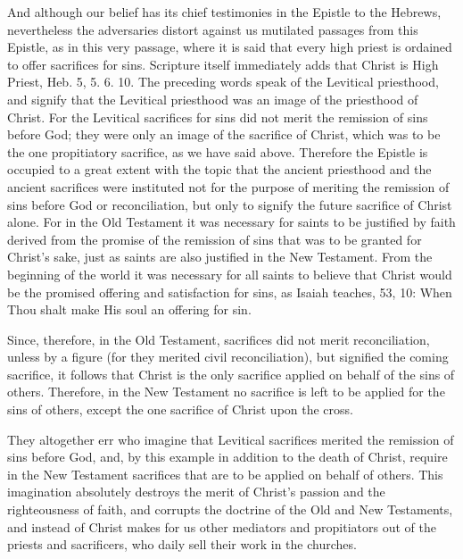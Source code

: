 And although our belief has its chief testimonies in the Epistle to
the Hebrews, nevertheless the adversaries distort against us
mutilated passages from this Epistle, as in this very passage, where
it is said that every high priest is ordained to offer sacrifices for
sins.  Scripture itself immediately adds that Christ is High Priest,
Heb. 5, 5. 6. 10. The preceding words speak of the Levitical
priesthood, and signify that the Levitical priesthood was an image of
the priesthood of Christ.  For the Levitical sacrifices for sins did
not merit the remission of sins before God; they were only an image
of the sacrifice of Christ, which was to be the one propitiatory
sacrifice, as we have said above.  Therefore the Epistle is occupied
to a great extent with the topic that the ancient priesthood and the
ancient sacrifices were instituted not for the purpose of meriting
the remission of sins before God or reconciliation, but only to
signify the future sacrifice of Christ alone.  For in the Old
Testament it was necessary for saints to be justified by faith
derived from the promise of the remission of sins that was to be
granted for Christ's sake, just as saints are also justified in the
New Testament.  From the beginning of the world it was necessary for
all saints to believe that Christ would be the promised offering and
satisfaction for sins, as Isaiah teaches, 53, 10: When Thou shalt
make His soul an offering for sin.

Since, therefore, in the Old Testament, sacrifices did not merit
reconciliation, unless by a figure (for they merited civil
reconciliation), but signified the coming sacrifice, it follows that
Christ is the only sacrifice applied on behalf of the sins of others.
Therefore, in the New Testament no sacrifice is left to be applied
for the sins of others, except the one sacrifice of Christ upon the
cross.

They altogether err who imagine that Levitical sacrifices merited the
remission of sins before God, and, by this example in addition to the
death of Christ, require in the New Testament sacrifices that are to
be applied on behalf of others.  This imagination absolutely destroys
the merit of Christ's passion and the righteousness of faith, and
corrupts the doctrine of the Old and New Testaments, and instead of
Christ makes for us other mediators and propitiators out of the
priests and sacrificers, who daily sell their work in the churches.

